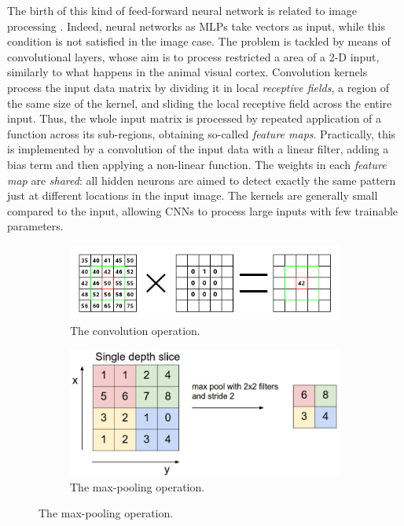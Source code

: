 The birth of this kind of feed-forward neural network is related to image processing \cite{lawrence1997face}. Indeed, neural networks as MLPs take vectors as input, while this condition is not satisfied in the image case. The problem is tackled by means of convolutional layers, whose aim is to process restricted a area of a 2-D input, similarly to what happens in the animal visual cortex.
Convolution kernels process the input data matrix by dividing it in local \textit{receptive fields}, a region of the same size of the kernel, and sliding the local receptive field across the entire input.
Thus, the whole input matrix is processed by repeated application of a function across its sub-regions, obtaining so-called \textit{feature maps}. Practically, this is implemented by a convolution of the input data with a linear filter, adding a bias term and then applying a non-linear function.
The weights in each \textit{feature map} are \textit{shared}: all hidden neurons are aimed to detect exactly the same pattern just at different locations in the input image. The kernels are generally small compared to the input, allowing CNNs to process large inputs with few trainable parameters.

\begin{figure}[h]
	\centering
	\begin{subfigure}[b]{0.4\columnwidth}
		\includegraphics[width=\columnwidth]{img/convolution-calculate}
		\caption{The convolution operation.}
	\end{subfigure}
	\begin{subfigure}[b]{0.4\columnwidth}
		\centering
		\includegraphics[width=0.7\columnwidth]{img/maxpool.jpeg}
		\caption{The max-pooling operation.}
	\end{subfigure}
	\label{fig:convolution}	
\end{figure}


